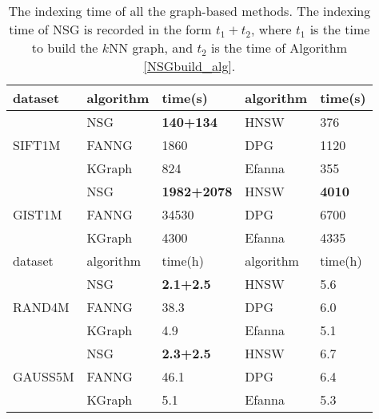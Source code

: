 \documentclass{vldb}
\begin{document}
\begin{table}[t]\scriptsize
	\caption{The indexing time of all the graph-based methods. The indexing time of NSG is recorded in the form $t_1+t_2$, where $t_1$ is the time to build the $k$NN graph, and $t_2$ is the time of Algorithm \ref{NSGbuild_alg}.}
	\label{index_time}
	\centering
	\begin{tabular}{|p{1.2cm}<{\centering}|p{1.1cm}<{\centering}|p{1.5cm}<{\centering}|p{1.1cm}<{\centering}|p{1.3cm}<{\centering}|}
		\hline
		dataset &  algorithm & time(s) &algorithm & time(s)\\
		\hline
		\multirow{3}{*}{SIFT1M} 
		&NSG & \textbf{140+134} & HNSW & 376\\
		\cline{2-5}
		&FANNG & 1860 & DPG & 1120 \\
		\cline{2-5}
		&KGraph & 824 & Efanna & 355 \\
		\hline
		\multirow{3}{*}{GIST1M} 
		&NSG & \textbf{1982+2078} & HNSW & \textbf{4010}\\
		\cline{2-5}
		&FANNG & 34530 & DPG & 6700 \\
		\cline{2-5}
		&KGraph & 4300 & Efanna & 4335 \\
		\hline
		dataset &  algorithm & time(h) &algorithm & time(h)\\
		\hline
		\multirow{3}{*}{RAND4M} 
		&NSG & \textbf{2.1+2.5} & HNSW & 5.6\\
		\cline{2-5}
		&FANNG & 38.3 & DPG & 6.0 \\
		\cline{2-5}
		&KGraph & 4.9 & Efanna & 5.1 \\
		\hline
		\multirow{3}{*}{GAUSS5M} 
		&NSG &  \textbf{2.3+2.5} & HNSW & 6.7\\
		\cline{2-5}
		&FANNG & 46.1 & DPG & 6.4 \\
		\cline{2-5}
		&KGraph & 5.1 & Efanna & 5.3 \\
		\hline
	\end{tabular}
\end{table}
\end{document}
